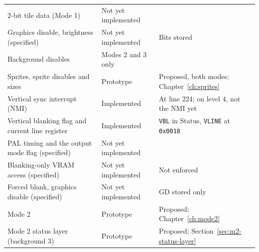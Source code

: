 \begin{table}[H]
\begin{tabular}{p{5.8cm}p{3.4cm}p{5.2cm}}
		2-bit tile data (Mode 1)                           & Not yet implemented                                          &                                                                                 \\
		Graphics disable, brightness (specified)           & Not yet implemented                                          & Bits stored                                                                     \\
		Background disables                                & Modes 2 and 3 only                                           &                                                                                 \\
		Sprites, sprite disables and sizes                 & Prototype                                                    & Proposed, both modes; Chapter~\ref{ch:sprites}                                  \\
		Vertical sync interrupt (NMI)                      & Implemented                                                  & At line 224; on level 4, not the NMI yet                                        \\
		Vertical blanking flag and current line register   & Implemented                                                  & \texttt{VBL} in Status, \texttt{VLINE} at \texttt{0x0018}                       \\
		PAL timing and the output mode flag (specified)    & Not yet implemented                                          &                                                                                 \\
		Blanking-only VRAM access (specified)              & Not yet implemented                                          & Not enforced                                                                    \\
		Forced blank, graphics disable (specified)         & Not yet implemented                                          & GD stored only                                                                  \\
		Mode 2                                             & Prototype                                                    & Proposed; Chapter~\ref{ch:mode2}                                                \\
		Mode 2 status layer (background 3)                 & Prototype                                                    & Proposed; Section~\ref{sec:m2-status-layer}                                     \\

\end{tabular}
\end{table}
